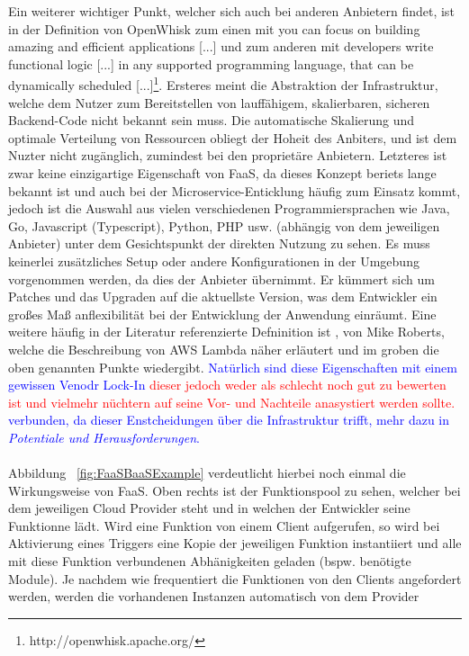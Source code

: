\documentclass[11pt]{article}
\begin{document}
Ein weiterer wichtiger Punkt, welcher sich auch bei anderen Anbietern findet, ist in der Definition von OpenWhisk zum einen mit \glqq[...] you can focus on building amazing and efficient applications [...]\grqq{} und zum anderen mit \glqq  developers write functional logic [...] in any supported programming language, that can be dynamically scheduled [...]\grqq{}\footnote{http://openwhisk.apache.org/}. Ersteres meint die Abstraktion der Infrastruktur, welche dem Nutzer zum Bereitstellen von lauffähigem, skalierbaren, sicheren Backend-Code nicht bekannt sein muss. Die automatische Skalierung und optimale Verteilung von Ressourcen obliegt der Hoheit des Anbiters, und ist dem Nuzter nicht zugänglich, zumindest bei den proprietäre Anbietern. Letzteres ist zwar keine einzigartige Eigenschaft von FaaS, da dieses Konzept beriets lange bekannt ist und auch bei der Microservice-Enticklung häufig zum Einsatz kommt, jedoch ist die Auswahl aus vielen verschiedenen Programmiersprachen wie Java, Go, Javascript (Typescript), Python, PHP usw. (abhängig von dem jeweiligen Anbieter) unter dem Gesichtspunkt der direkten Nutzung zu sehen. Es muss keinerlei zusätzliches Setup oder andere Konfigurationen in der Umgebung vorgenommen werden, da dies der Anbieter übernimmt. Er kümmert sich um Patches und das Upgraden auf die aktuellste Version, was dem Entwickler ein großes Maß anflexibilität bei der Entwicklung der Anwendung einräumt. Eine weitere häufig in der Literatur referenzierte Defninition ist \cite{fowler2018serverless}, von Mike Roberts, welche die Beschreibung von AWS Lambda näher erläutert und im groben die oben genannten Punkte wiedergibt. \textcolor{blue}{Natürlich sind diese Eigenschaften mit einem gewissen Venodr Lock-In \textcolor{red}{dieser jedoch weder als schlecht noch gut zu bewerten ist und vielmehr nüchtern auf seine Vor- und Nachteile anasystiert werden sollte.} verbunden, da dieser Enstcheidungen über die Infrastruktur trifft, mehr dazu in \textit{Potentiale und Herausforderungen}.}\\\\
Abbildung ~\ref{fig:FaaSBaaSExample} verdeutlicht hierbei noch einmal die Wirkungsweise von FaaS. Oben rechts ist der Funktionspool zu sehen, welcher bei dem jeweiligen Cloud Provider steht und in welchen der Entwickler seine Funktionne lädt. Wird eine Funktion von einem Client aufgerufen, so wird bei Aktivierung eines Triggers eine Kopie der jeweiligen Funktion instantiiert und alle mit diese Funktion verbundenen Abhänigkeiten geladen (bspw. benötigte Module). Je nachdem wie frequentiert die Funktionen von den Clients angefordert werden, werden die vorhandenen Instanzen automatisch von dem Provider 
\end{document}
